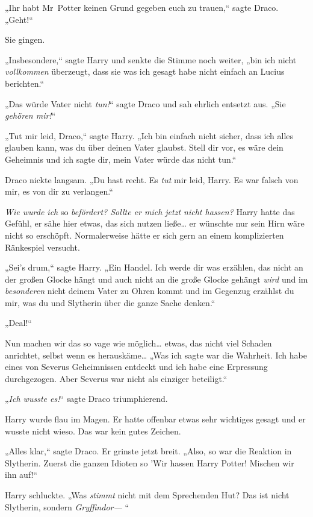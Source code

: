 {„Ihr habt Mr~Potter keinen Grund gegeben euch zu trauen,“ sagte Draco. „Geht!“

Sie gingen.

„Insbesondere,“ sagte Harry und senkte die Stimme noch weiter, „bin ich nicht \emph{vollkommen} überzeugt, dass sie was ich gesagt habe nicht einfach an Lucius berichten.“

„Das würde Vater nicht \emph{tun!}“ sagte Draco und sah ehrlich entsetzt aus. „Sie \emph{gehören mir!}“

„Tut mir leid, Draco,“ sagte Harry. „Ich bin einfach nicht sicher, dass ich alles glauben kann, was du über deinen Vater glaubst. Stell dir vor, es wäre dein Geheimnis und ich sagte dir, mein Vater würde das nicht tun.“

Draco nickte langsam. „Du hast recht. Es \emph{tut} mir leid, Harry. Es war falsch von mir, es von dir zu verlangen.“

\emph{Wie wurde ich} so \emph{befördert? Sollte er mich jetzt nicht hassen?} Harry hatte das Gefühl, er sähe hier etwas, das sich nutzen ließe… er wünschte nur sein Hirn wäre nicht so erschöpft. Normalerweise hätte er sich gern an einem komplizierten Ränkespiel versucht.

„Sei's drum,“ sagte Harry. „Ein Handel. Ich werde dir was erzählen, das nicht an der großen Glocke hängt und auch nicht an die große Glocke gehängt \emph{wird} und im \emph{besonderen} nicht deinem Vater zu Ohren kommt und im Gegenzug erzählst du mir, was du und Slytherin über die ganze Sache denken.“

„Deal!“

Nun machen wir das so vage wie möglich… etwas, das nicht viel Schaden anrichtet, selbst wenn es herauskäme… „Was ich sagte war die Wahrheit. Ich habe eines von Severus Geheimnissen entdeckt und ich habe eine Erpressung durchgezogen. Aber Severus war nicht als einziger beteiligt.“

„\emph{Ich wusste es!}“ sagte Draco triumphierend.

Harry wurde flau im Magen. Er hatte offenbar etwas sehr wichtiges gesagt und er wusste nicht wieso. Das war kein gutes Zeichen.

„Alles klar,“ sagte Draco. Er grinste jetzt breit. „Also, so war die Reaktion in Slytherin. Zuerst die ganzen Idioten so 'Wir hassen Harry Potter! Mischen wir ihn auf!“

Harry schluckte. „Was \emph{stimmt} nicht mit dem Sprechenden Hut? Das ist nicht Slytherin, sondern \emph{Gryffindor—} “

}
